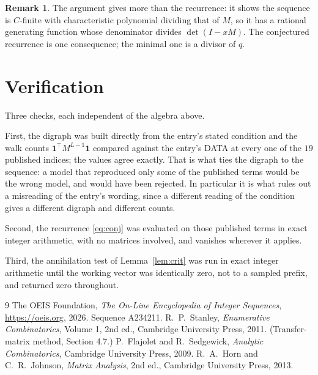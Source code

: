 \documentclass[11pt,a4paper]{article}
\theoremstyle{plain}
\theoremstyle{definition}
\newtheorem{remark}[theorem]{Remark}
\begin{document}
\begin{remark}
The argument gives more than the recurrence: it shows the sequence is $C$-finite with
characteristic polynomial dividing that of $M$, so it has a rational generating function
whose denominator divides $\det(I-xM)$. The conjectured recurrence is one consequence; the
minimal one is a divisor of $q$.
\end{remark}

\section{Verification}

Three checks, each independent of the algebra above.

First, the digraph was built directly from the entry's stated condition and the walk counts
$\mathbf{1}^{\!\top}M^{L-1}\mathbf{1}$ compared against the entry's DATA at
every one of the $19$ published indices; the values agree exactly. That is what ties
the digraph to the sequence: a model that reproduced only some of the published terms would
be the wrong model, and would have been rejected. In particular it is what rules out a
misreading of the entry's wording, since a different reading of the condition gives a
different digraph and different counts.

Second, the recurrence \eqref{eq:conj} was evaluated on those published terms in exact
integer arithmetic, with no matrices involved, and vanishes wherever it applies.

Third, the annihilation test of Lemma~\ref{lem:crit} was run in exact integer arithmetic
until the working vector was identically zero, not to a sampled prefix, and returned zero
throughout.

\begin{thebibliography}{9}
 The OEIS Foundation, \emph{The On-Line Encyclopedia of Integer
Sequences}, \url{https://oeis.org}, 2026. Sequence A234211.
 R.~P.~Stanley, \emph{Enumerative Combinatorics}, Volume 1, 2nd ed.,
Cambridge University Press, 2011. (Transfer-matrix method, Section 4.7.)
 P.~Flajolet and R.~Sedgewick, \emph{Analytic Combinatorics}, Cambridge
University Press, 2009.
 R.~A.~Horn and C.~R.~Johnson, \emph{Matrix Analysis}, 2nd ed., Cambridge
University Press, 2013.
\end{thebibliography}
\end{document}
